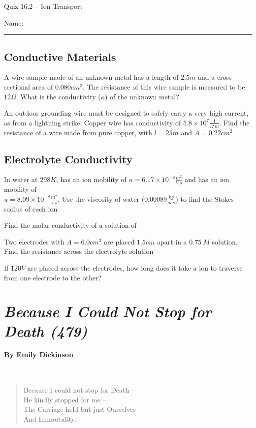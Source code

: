 \documentclass[11pt, letterpaper]{memoir}
\begin{document}
	\begin{center}
		{\large Quiz 16.2 -- Ion Transport}
	\end{center}
	{\large Name: \rule[-1mm]{4in}{.1pt} 


\subsection*{Conductive Materials}
A wire sample made of an unknown metal has a length of $2.5m$ and a cross-sectional area of $0.080cm^2$. The resistance of this wire sample is measured to be $12\Omega$. What is the conductivity ($\kappa$) of the unknown metal?

\vspace{4em}\noindent
An outdoor grounding wire must be designed to safely carry a very high current, as from a lightning strike. Copper wire has conductivity of $5.8\times10^7\frac{1}{\Omega~m}$. Find the resistance of a wire made from pure copper, with $l=25m$ and $A=0.22cm^2$

\vspace{4em}
\subsection*{Electrolyte Conductivity}
In water at $298K$,  has an ion mobility of $u=6.17\times10^{-8}\frac{m^2}{V~s}$ and  has an ion mobility of \\$u=8.09\times10^{-8}\frac{m^2}{V~s}$. Use the viscosity of water ($0.00089\frac{kg}{m~s}$) to find the Stokes radius of each ion

\vspace{5em}\noindent
Find the molar conductivity of a solution of 

\vspace{4em}\noindent
Two electrodes with $A=6.0cm^2$ are placed $1.5cm$ apart in a $0.75~M$  solution. Find the resistance across the electrolyte solution

\vspace{6em}\noindent
If $120V$ are placed across the electrodes, how long does it take a  ion to traverse from one electrode to the other?


\newpage
\pagestyle{empty}
\addtocounter{page}{-1}	
\section*{\emph{Because I Could Not Stop for Death (479)}}
\paragraph{By Emily Dickinson}~
\begin{verse}
	Because I could not stop for Death –\\
	He kindly stopped for me –\\
	The Carriage held but just Ourselves –\\
	And Immortality.
	

\end{verse}}
\end{document}
